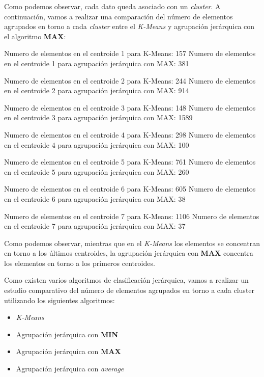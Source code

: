 \documentclass [a4paper] {article}
\begin{document}
Como podemos observar, cada dato queda asociado con un \textit{cluster}.
A continuación, vamos a realizar una comparación del número de elementos agrupados en torno a cada \textit{cluster} entre el \textit{K-Means} y agrupación jerárquica con el algoritmo \textbf{MAX}:
\begin{footnotesize}
\begin{Schunk}
\begin{Soutput}
Numero de elementos en el centroide  1  para K-Means:  157 
Numero de elementos en el centroide  1  para agrupación jerárquica con MAX:  381 

Numero de elementos en el centroide  2  para K-Means:  244 
Numero de elementos en el centroide  2  para agrupación jerárquica con MAX:  914 

Numero de elementos en el centroide  3  para K-Means:  148 
Numero de elementos en el centroide  3  para agrupación jerárquica con MAX:  1589 

Numero de elementos en el centroide  4  para K-Means:  298 
Numero de elementos en el centroide  4  para agrupación jerárquica con MAX:  100 

Numero de elementos en el centroide  5  para K-Means:  761 
Numero de elementos en el centroide  5  para agrupación jerárquica con MAX:  260 

Numero de elementos en el centroide  6  para K-Means:  605 
Numero de elementos en el centroide  6  para agrupación jerárquica con MAX:  38 

Numero de elementos en el centroide  7  para K-Means:  1106 
Numero de elementos en el centroide  7  para agrupación jerárquica con MAX:  37 
\end{Soutput}
\end{Schunk}
\end{footnotesize}
Como podemos observar, mientras que en el \textit{K-Means} los elementos se concentran en torno a los últimos centroides, la agrupación jerárquica con \textbf{MAX} concentra los elementos en torno a los primeros centroides.

Como existen varios algoritmos de clasificación jerárquica, vamos a realizar un estudio comparativo del número de elementos agrupados en torno a cada cluster utilizando los siguientes algoritmos:
\begin{itemize}
  \item \textit{K-Means}
  \item Agrupación jerárquica con \textbf{MIN}
  \item Agrupación jerárquica con \textbf{MAX}
  \item Agrupación jerárquica con \textit{average}
\end{itemize}
\end{document}
